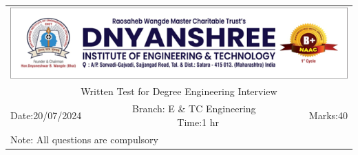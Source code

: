 \documentclass[a4, 12pt, addpoints]{exam}
\begin{document}
\def\arraystretch{1}
\begin{longtable}{lp{}p{}r}
\multicolumn{4}{c}{\includegraphics[width= \textwidth]{dietlogo}} \\ 
\multicolumn{4}{c}{Written Test for Degree Engineering Interview} \\
Date:20/07/2024 & \multicolumn{2}{c}{ ~~~Branch: E \& TC Engineering ~~~~ Time:1 hr} & Marks:40 \\
\multicolumn{4}{l}{ Note: All questions are compulsory  } \\ \hline
\end{longtable}
\end{document}
